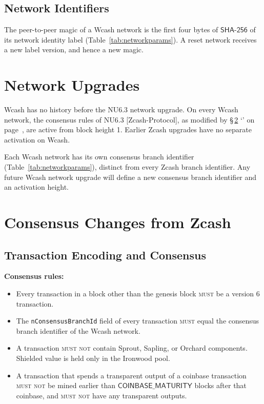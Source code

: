 \documentclass[10pt,letterpaper]{article}
\newcommand\MUST{\textsc{must}}
\newcommand\MUSTNOT{\textsc{must not}}
\newcommand\fn[1]{\mathsf{#1}}
\newcommand\secref[1]{\S\,\ref{#1} `\nameref{#1}' on page~\pageref{#1}}
\newcommand\rules[1]{\par\textbf{#1}}
\theoremstyle{plain}
\begin{document}
\subsection{Network Identifiers}\label{sec:netids}

The peer-to-peer magic of a Wcash network is the first four bytes of $\fn{SHA\text{-}256}$ of its network identity label (Table~\ref{tab:networkparams}). A reset network receives a new label version, and hence a new magic.

\section{Network Upgrades}\label{sec:upgrades}

Wcash has no history before the NU6.3 network upgrade. On every Wcash network, the consensus rules of NU6.3 [Zcash-Protocol], as modified by \secref{sec:consensus}, are active from block height 1. Earlier Zcash upgrades have no separate activation on Wcash.

Each Wcash network has its own consensus branch identifier (Table~\ref{tab:networkparams}), distinct from every Zcash branch identifier. Any future Wcash network upgrade will define a new consensus branch identifier and an activation height.

\section{Consensus Changes from Zcash}\label{sec:consensus}

\subsection{Transaction Encoding and Consensus}\label{sec:txrules}

\rules{Consensus rules:}
\begin{itemize}
\item Every transaction in a block other than the genesis block \MUST{} be a version 6 transaction.
\item The \texttt{nConsensusBranchId} field of every transaction \MUST{} equal the consensus branch identifier of the Wcash network.
\item A transaction \MUSTNOT{} contain Sprout, Sapling, or Orchard components. Shielded value is held only in the Ironwood pool.
\item A transaction that spends a transparent output of a coinbase transaction \MUSTNOT{} be mined earlier than $\fn{COINBASE\_MATURITY}$ blocks after that coinbase, and \MUSTNOT{} have any transparent outputs.
\end{itemize}
\end{document}
